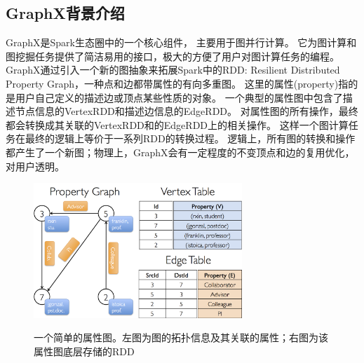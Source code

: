 \documentclass[master]{njuthesis}
\begin{document}
\subsection{GraphX背景介绍}
GraphX\cite{DBLP:conf/osdi/GonzalezXDCFS14}是Spark生态圈中的一个核心组件， 主要用于图并行计算。
它为图计算和图挖掘任务提供了简洁易用的接口，极大的方便了用户对图计算任务的编程。
GraphX通过引入一个新的图抽象来拓展Spark中的RDD: Resilient Distributed Property Graph，一种点和边都带属性的有向多重图。
这里的属性(property)指的是用户自己定义的描述边或顶点某些性质的对象。
一个典型的属性图中包含了描述节点信息的VertexRDD和描述边信息的EdgeRDD。
对属性图的所有操作，最终都会转换成其关联的VertexRDD和的EdgeRDD上的相关操作。
这样一个图计算任务在最终的逻辑上等价于一系列RDD的转换过程。
逻辑上，所有图的转换和操作都产生了一个新图；物理上，GraphX会有一定程度的不变顶点和边的复用优化，对用户透明。
\begin{figure}[htbp]
  \centering
  \includegraphics[width= 0.7\textwidth]{figure/property_graph.png}\\
  \caption{一个简单的属性图。左图为图的拓扑信息及其关联的属性；右图为该属性图底层存储的RDD}
  \label{fig:property_graph}
\end{figure}
\end{document}
